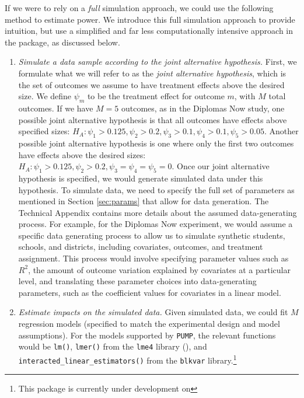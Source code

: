 \documentclass[
]{jss}
\begin{document}
If we were to rely on a \emph{full} simulation approach, we could use
the following method to estimate power. We introduce this full
simulation approach to provide intuition, but use a simplified and far
less computationally intensive approach in the package, as discussed
below.

\begin{enumerate}
\def\labelenumi{\arabic{enumi}.}
\item
  \emph{Simulate a data sample according to the joint alternative
  hypothesis.} First, we formulate what we will refer to as the
  \emph{joint alternative hypothesis}, which is the set of outcomes we
  assume to have treatment effects above the desired size. We define
  \(\psi_m\) to be the treatment effect for outcome \(m\), with \(M\)
  total outcomes. If we have \(M = 5\) outcomes, as in the Diplomas Now
  study, one possible joint alternative hypothesis is that all outcomes
  have effects above specified sizes:
  \(H_A: \psi_1 > 0.125, \psi_2 > 0.2, \psi_3 > 0.1, \psi_4 > 0.1, \psi_5 > 0.05\).
  Another possible joint alternative hypothesis is one where only the
  first two outcomes have effects above the desired sizes:
  \(H_A: \psi_1 > 0.125, \psi_2 > 0.2, \psi_3 = \psi_4 = \psi_5 = 0\).
  Once our joint alternative hypothesis is specified, we would generate
  simulated data under this hypothesis. To simulate data, we need to
  specify the full set of parameters as mentioned in Section
  \ref{sec:params} that allow for data generation. The Technical
  Appendix contains more details about the assumed data-generating
  process. For example, for the Diplomas Now experiment, we would assume
  a specific data generating process to allow us to simulate synthetic
  students, schools, and districts, including covariates, outcomes, and
  treatment assignment. This process would involve specifying parameter
  values such as \(R^2\), the amount of outcome variation explained by
  covariates at a particular level, and translating these parameter
  choices into data-generating parameters, such as the coefficient
  values for covariates in a linear model.
\item
  \emph{Estimate impacts on the simulated data.} Given simulated data,
  we could fit \(M\) regression models (specified to match the
  experimental design and model assumptions). For the models supported
  by \texttt{PUMP}, the relevant functions would be \texttt{lm()},
  \texttt{lmer()} from the \texttt{lme4} library (\citet{lme4}), and
  \texttt{interacted\_linear\_estimators()} from the \texttt{blkvar}
  library.\footnote{This package is currently under development on
}
\end{enumerate}
\end{document}
